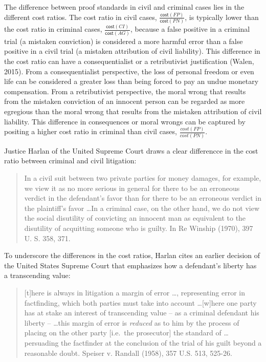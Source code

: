 \documentclass[10pt,dvipsnames,enabledeprecatedfontcommands]{scrartcl}
\newcommand{\cost}{\mathsf{cost}}
\begin{document}
The difference between proof standards in civil and criminal cases lies
in the different cost ratios. The cost ratio in civil cases,
\(\frac{\cost(FP)}{\cost(PN)}\), is typically lower than the cost ratio
in criminal cases, \(\frac{\cost(CI)}{\cost(AG)}\), because a false
positive in a criminal trial (a mistaken conviction) is considered a
more harmful error than a false positive in a civil trial (a mistaken
attribution of civil liability). This difference in the cost ratio can
have a consequentialist or a retributivist justification (Walen, 2015).
From a consequentialist perspective, the loss of personal freedom or
even life can be considered a greater loss than being forced to pay an
undue monetary compensation. From a retributivist perspective, the moral
wrong that results from the mistaken conviction of an innocent person
can be regarded as more egregious than the moral wrong that results from
the mistaken attribution of civil liability. This difference in
consequences or moral wrongs can be captured by positing a higher cost
ratio in criminal than civil cases, \(\frac{cost(FP)}{cost(PN)}\).

Justice Harlan of the United Supreme Court draws a clear differencce in
the cost ratio between criminal and civil litigation:

\begin{quote}
In a civil suit between two private parties for money damages, for example, we view it as no more serious in general for there to be an erroneous verdict in the defendant's favor than for there to be an erroneous verdict in the plaintiff's favor \dots In a criminal case, on the other hand, we do not view the social disutility of convicting an innocent man as equivalent to the disutility of acquitting someone who is guilty. In Re Winship (1970), 397 U. S. 358, 371.
\end{quote}

\noindent To underscore the differences in the cost ratios, Harlan cites
an earlier decision of the United States Supreme Court that emphasizes
how a defendant's liberty has a transcending value:

\begin{quote}
[t]here is always in litigation a margin of error \dots, representing error in factfinding, which both parties must take into account \dots [w]here one party has at stake an interest of transcending value -- as a criminal defendant his liberty -- \dots this margin of error is \textit{reduced} as to him by the process of placing on the other 
party [i.e.\ the prosecutor] the standard of \dots persuading the factfinder at the conclusion of the trial of his guilt beyond a reasonable doubt. Speiser v. Randall (1958), 357 U.S. 513, 525-26.
\end{quote}
\end{document}

